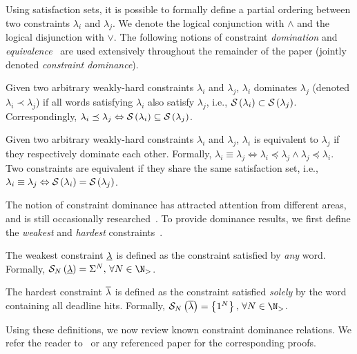 Using satisfaction sets, it is possible to formally define a partial ordering between two constraints $\lambda_i$ and $\lambda_j$.
We denote the logical conjunction with $\land$ and the logical disjunction with $\lor$.
The following notions of constraint \emph{domination} and \emph{equivalence}~\cite{Bernat:2001, Bernat:1998} are used extensively throughout the remainder of the paper (jointly denoted \emph{constraint dominance}).
%
\begin{definition}%
\label{def:domination}%
    Given two arbitrary weakly-hard constraints $\lambda_i$ and $\lambda_j$, $\lambda_i$ dominates $\lambda_j$ (denoted $\lambda_i \prec \lambda_j$) if all words satisfying $\lambda_i$ also satisfy $\lambda_j$, i.e., $\mathcal{S}_{}\left( \lambda_i \right) \subset \mathcal{S}_{}\left( \lambda_j \right)$.
    Correspondingly, $\lambda_i \preceq \lambda_j \Leftrightarrow \mathcal{S}_{}\left( \lambda_i \right) \subseteq \mathcal{S}_{}\left( \lambda_j \right)$.
\end{definition}
%
\begin{definition}%
\label{def:equivalence}%
    Given two arbitrary weakly-hard constraints $\lambda_i$ and $\lambda_j$, $\lambda_i$ is equivalent to $\lambda_j$ if they respectively dominate each other.
    Formally, $\lambda_i \equiv \lambda_j \Leftrightarrow \lambda_i \preceq \lambda_j \land \lambda_j \preceq \lambda_i$. Two constraints are equivalent if they share the same satisfaction set, i.e., $\lambda_i \equiv \lambda_j \Leftrightarrow \mathcal{S}_{}\left( \lambda_i \right) = \mathcal{S}_{}\left( \lambda_j \right)$.
\end{definition}

The notion of constraint dominance has attracted attention from different areas, and is still occasionally researched~\cite{Wu:2020, Tu:2007}.
To provide dominance results, we first define the \emph{weakest} and \emph{hardest} constraints~\cite{Bernat:2001, Bernat:1998}.
%
\begin{definition}%
\label{def:weakest}%
    The weakest constraint $\underline{\lambda}$ is defined as the constraint satisfied by \emph{any} word.
    Formally, $\sset{N}{\lweak} = \Sigma^N,\,\forall N \in \N_{>}$.
\end{definition}
%
\begin{definition}%
\label{def:hardest}%
    The hardest constraint $\overline{\lambda}$ is defined as the constraint satisfied \emph{solely} by the word containing all deadline hits.
    Formally, $\sset{N}{\lhard} = \left\{ 1^N \right\},\,\forall N \in \N_{>}$.
\end{definition}
Using these definitions, we now review known constraint dominance relations.
We refer the reader to~\cite{Bernat:1998} or any referenced paper for the corresponding proofs.

